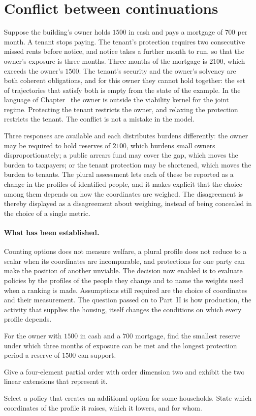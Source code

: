 \section{Conflict between continuations}

Suppose the building's owner holds $1500$ in cash and pays a mortgage of $700$ per month. A tenant stops paying. The tenant's protection requires two consecutive missed rents before notice, and notice takes a further month to run, so that the owner's exposure is three months. Three months of the mortgage is $2100$, which exceeds the owner's $1500$. The tenant's security and the owner's solvency are both coherent obligations, and for this owner they cannot hold together: the set of trajectories that satisfy both is empty from the state of the example. In the language of Chapter~ the owner is outside the viability kernel for the joint regime. Protecting the tenant restricts the owner, and relaxing the protection restricts the tenant. The conflict is not a mistake in the model.

Three responses are available and each distributes burdens differently: the owner may be required to hold reserves of $2100$, which burdens small owners disproportionately; a public arrears fund may cover the gap, which moves the burden to taxpayers; or the tenant protection may be shortened, which moves the burden to tenants. The plural assessment lets each of these be reported as a change in the profiles of identified people, and it makes explicit that the choice among them depends on how the coordinates are weighed. The disagreement is thereby displayed as a disagreement about weighing, instead of being concealed in the choice of a single metric.

\paragraph{What has been established.} Counting options does not measure welfare, a plural profile does not reduce to a scalar when its coordinates are incomparable, and protections for one party can make the position of another unviable. The decision now enabled is to evaluate policies by the profiles of the people they change and to name the weights used when a ranking is made. Assumptions still required are the choice of coordinates and their measurement. The question passed on to Part~II is how production, the activity that supplies the housing, itself changes the conditions on which every profile depends.

\begin{exercise}
For the owner with $1500$ in cash and a $700$ mortgage, find the smallest reserve under which three months of exposure can be met and the longest protection period a reserve of $1500$ can support.
\end{exercise}
\begin{exercise}
Give a four-element partial order with order dimension two and exhibit the two linear extensions that represent it.
\end{exercise}
\begin{exercise}
Select a policy that creates an additional option for some households. State which coordinates of the profile it raises, which it lowers, and for whom.
\end{exercise}
